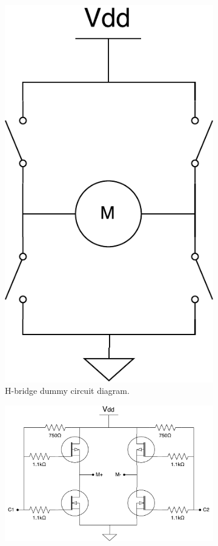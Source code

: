 \documentclass[letterpaper, 11pt]{article}
\begin{document}
\begin{enumerate}[label=\textbf{\arabic*.}]
\begin{figure}[ht]
    \centering
    \begin{subfigure}[t]{0.33\textwidth}
        \centering
        \includegraphics[height=0.3\textheight]{images/hbridge.pdf}
        \caption{H-bridge dummy circuit diagram.}
        \label{fig:hb-dummy}
    \end{subfigure}\hfill
    \begin{subfigure}[t]{0.66\textwidth}
        \includegraphics[height=0.3\textheight]{images/hbridge-circuit.pdf}

\end{subfigure}
\end{figure}
\end{enumerate}
\end{document}
